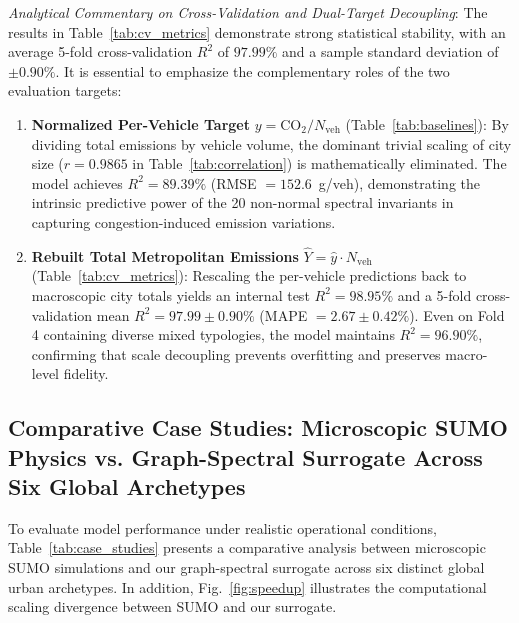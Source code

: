 \documentclass[journal]{IEEEtran}
\begin{document}
\textit{Analytical Commentary on Cross-Validation and Dual-Target Decoupling}:
The results in Table~\ref{tab:cv_metrics} demonstrate strong statistical stability, with an average 5-fold cross-validation $R^2$ of $97.99\%$ and a sample standard deviation of $\pm 0.90\%$. It is essential to emphasize the complementary roles of the two evaluation targets:
\begin{enumerate}
    \item \textbf{Normalized Per-Vehicle Target} $y = \text{CO}_2 / N_{\text{veh}}$ (Table~\ref{tab:baselines}): By dividing total emissions by vehicle volume, the dominant trivial scaling of city size ($r = 0.9865$ in Table~\ref{tab:correlation}) is mathematically eliminated. The model achieves $R^2 = 89.39\%$ (RMSE $= 152.6$~g/veh), demonstrating the intrinsic predictive power of the 20 non-normal spectral invariants in capturing congestion-induced emission variations.
    \item \textbf{Rebuilt Total Metropolitan Emissions} $\hat{Y} = \hat{y} \cdot N_{\text{veh}}$ (Table~\ref{tab:cv_metrics}): Rescaling the per-vehicle predictions back to macroscopic city totals yields an internal test $R^2 = 98.95\%$ and a 5-fold cross-validation mean $R^2 = 97.99 \pm 0.90\%$ (MAPE $= 2.67 \pm 0.42\%$). Even on Fold 4 containing diverse mixed typologies, the model maintains $R^2 = 96.90\%$, confirming that scale decoupling prevents overfitting and preserves macro-level fidelity.
\end{enumerate}

\subsection{Comparative Case Studies: Microscopic SUMO Physics vs. Graph-Spectral Surrogate Across Six Global Archetypes}
To evaluate model performance under realistic operational conditions, Table~\ref{tab:case_studies} presents a comparative analysis between microscopic SUMO simulations and our graph-spectral surrogate across six distinct global urban archetypes. In addition, Fig.~\ref{fig:speedup} illustrates the computational scaling divergence between SUMO and our surrogate.
\end{document}
